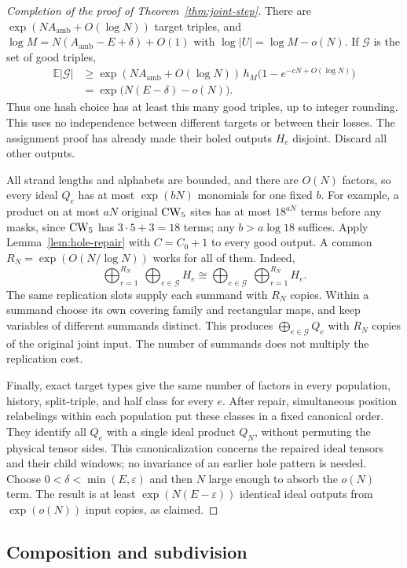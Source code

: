 \begin{proof}[Completion of the proof of Theorem~\ref{thm:joint-step}]
There are $\exp(NA_{\mathrm{amb}}+O(\log N))$ target triples, and
$\log M=N(A_{\mathrm{amb}}-E+\delta)+O(1)$ with
$\log|U|=\log M-o(N)$.  If $\mathcal G$ is the set of good triples,
\begin{align*}
 \mathbb E|\mathcal G|
 &\geq\exp(NA_{\mathrm{amb}}+O(\log N))\,h_M
       \bigl(1-e^{-cN+O(\log N)}\bigr)\\
 &=\exp\bigl(N(E-\delta)-o(N)\bigr).
\end{align*}
Thus one hash choice has at least this many good triples, up to
integer rounding.  This uses no independence between different
targets or between their losses.  The assignment proof has already
made their holed outputs $H_e$ disjoint.  Discard all other outputs.

All strand lengths and alphabets are bounded, and there are $O(N)$
factors, so every ideal $Q_e$ has at most $\exp(bN)$ monomials for
one fixed $b$.  For example, a product on at most $aN$ original
$\mathrm{CW}_5$ sites has at most $18^{aN}$ terms before any masks, since
$\mathrm{CW}_5$ has $3\cdot5+3=18$ terms; any $b>a\log18$ suffices.
Apply Lemma~\ref{lem:hole-repair} with
$C=C_0+1$ to every good output.  A common
$R_N=\exp(O(N/\log N))$ works for all of them.  Indeed,
\[
 \bigoplus_{r=1}^{R_N}\ \bigoplus_{e\in\mathcal G} H_e
 \cong
 \bigoplus_{e\in\mathcal G}\ \bigoplus_{r=1}^{R_N}H_e.
\]
The same replication slots supply each summand with $R_N$ copies.
Within a summand choose its own covering family and rectangular
maps, and keep variables of different summands distinct.  This
produces $\bigoplus_{e\in\mathcal G}Q_e$ with $R_N$ copies of the
original joint input.  The number of summands does not multiply the
replication cost.

Finally, exact target types give the same number of factors in every
population, history, split-triple, and half class for every $e$.
After repair, simultaneous position relabelings within each population
put these classes in a fixed canonical order.  They identify all
$Q_e$ with a single ideal product $Q_N$, without permuting the physical
tensor sides.  This canonicalization concerns the repaired ideal
tensors and their child windows; no invariance of an earlier hole
pattern is needed.  Choose $0<\delta<\min(E,\varepsilon)$ and then $N$ large
enough to absorb the $o(N)$ term.  The result is at least
$\exp(N(E-\varepsilon))$ identical ideal outputs from
$\exp(o(N))$ input copies, as claimed.
\end{proof}

\subsection{Composition and subdivision}\label{sec:recovery-composition}

